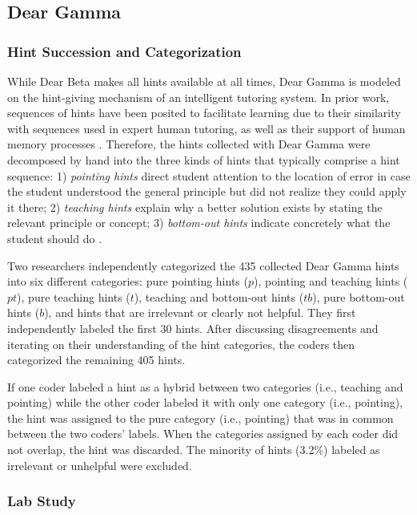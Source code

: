 \subsection{Dear Gamma}

\subsubsection{Hint Succession and Categorization}

While Dear Beta makes all hints available at all times, Dear Gamma is modeled on the hint-giving mechanism of an intelligent tutoring system. In prior work, sequences of hints have been posited to facilitate learning due to their similarity with sequences used in expert human tutoring, as well as their support of human memory processes \cite{sottilare2014design}. Therefore, the hints collected with Dear Gamma were decomposed by hand into the three kinds of hints that typically comprise a hint sequence: 1) \textit{pointing hints} direct student attention to the location of error in case the student understood the general principle but did not realize they could apply it there; 2) \textit{teaching hints} explain why a better solution exists by stating the relevant principle or concept; 3) \textit{bottom-out hints} indicate concretely what the student should do \cite{andes}. 

Two researchers independently categorized the 435 collected Dear Gamma hints into six different categories: pure pointing hints ($p$), pointing and teaching hints ($pt$), pure teaching hints ($t$), teaching and bottom-out hints ($tb$), pure bottom-out hints ($b$), and hints that are irrelevant or clearly not helpful. They first independently labeled the first 30 hints. After discussing disagreements and iterating on their understanding of the hint categories, the coders then categorized the remaining 405 hints. 

If one coder labeled a hint as a hybrid between two categories (i.e., teaching and pointing) while the other coder labeled it with only one category (i.e., pointing), the hint was assigned to the pure category (i.e., pointing) that was in common between the two coders' labels. When the categories assigned by each coder did not overlap, the hint was discarded. The minority of hints (3.2\%) labeled as irrelevant or unhelpful were excluded.

\subsubsection{Lab Study}

